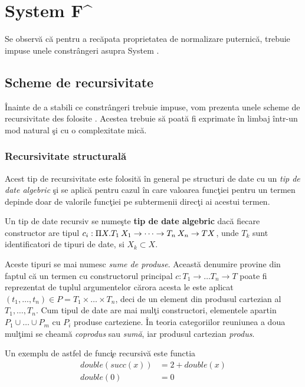
\chapter{System F\^{}}
\label{Capitolul3}

Se observ\u a c\u a pentru a rec\u apata proprietatea de normalizare puternic\u a, trebuie impuse unele constr\^ angeri asupra System \frec.
\section{Scheme de recursivitate}
\label{scheme_rec}
\^ Inainte de a stabili ce constr\^ angeri trebuie impuse, vom prezenta unele scheme de recursivitate des folosite \citep{varmo_vene}. Acestea trebuie s\u a poat\u a fi exprimate \^ in limbaj \^ intr-un mod natural \c si cu o complexitate mic\u a.

\subsection{Recursivitate structural\u a}
Acest tip de recursivitate este folosit\u a \^ in general pe structuri de date cu un \emph{tip de date algebric} \c si se aplic\u a pentru cazul \^ in care valoarea func\c tiei pentru un termen depinde doar de valorile func\c tiei pe subtermenii direc\c ti ai acestui termen.
\begin{definition}
Un tip de date recursiv se nume\c ste \textbf{tip de date algebric} dac\u a fiecare constructor are tipul $ c_i : \Pi X . T_1\hspace{2pt} X_1 \to \dots \to T_n\hspace{2pt} X_n\to T X $, unde $T_k$ sunt identificatori de tipuri de date, si $X_k \subset X$.
\end{definition}
Aceste tipuri se mai numesc \emph{sume de produse}. Aceast\u a denumire provine din faptul c\u a un termen cu constructorul principal $c : T_1\to \dots T_n\to T $ poate fi reprezentat de tuplul argumentelor c\u arora acesta le este aplicat $(t_1,\dots,t_n)\in P = T_1 \times \dots \times T_n $, deci de un element din produsul cartezian al $T_1, \dots, T_n$. Cum tipul de date are mai mul\c ti constructori, elementele apartin $P_1 \cup \dots \cup P_m $ cu $P_i$ produse carteziene. \^ In teoria categoriilor reuniunea a doua mul\c timi se cheam\u a \emph{coprodus} sau \emph{sum\u a}, iar produsul cartezian \emph{produs}.
\begin{example}
Un exemplu de astfel de func\c ie recursiv\u a este functia
\begin{align*}
double(succ(x)) &= 2 + double(x)\\
      double(0) &= 0
\end{align*}
\end{example}

